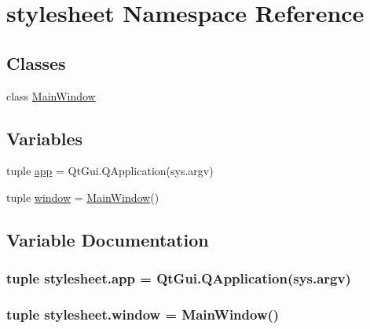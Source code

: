 \hypertarget{namespacestylesheet}{}\section{stylesheet Namespace Reference}
\label{namespacestylesheet}
\subsection*{Classes}
\begin{DoxyCompactItemize}
\item 
class \hyperlink{classstylesheet_1_1MainWindow}{Main\+Window}
\end{DoxyCompactItemize}
\subsection*{Variables}
\begin{DoxyCompactItemize}
\item 
tuple \hyperlink{namespacestylesheet_ae8e78dd5eabea81d714ecb122aae92c3}{app} = Qt\+Gui.\+Q\+Application(sys.\+argv)
\item 
tuple \hyperlink{namespacestylesheet_a7520cf387ed35bf6ebb43defd0496046}{window} = \hyperlink{classstylesheet_1_1MainWindow}{Main\+Window}()
\end{DoxyCompactItemize}


\subsection{Variable Documentation}
\hypertarget{namespacestylesheet_ae8e78dd5eabea81d714ecb122aae92c3}{}
\subsubsection[{app}]{\setlength{\rightskip}{0pt plus 5cm}tuple stylesheet.\+app = Qt\+Gui.\+Q\+Application(sys.\+argv)}\label{namespacestylesheet_ae8e78dd5eabea81d714ecb122aae92c3}
\hypertarget{namespacestylesheet_a7520cf387ed35bf6ebb43defd0496046}{}
\subsubsection[{window}]{\setlength{\rightskip}{0pt plus 5cm}tuple stylesheet.\+window = {\bf Main\+Window}()}\label{namespacestylesheet_a7520cf387ed35bf6ebb43defd0496046}

